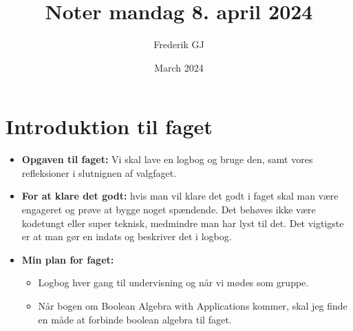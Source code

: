 \documentclass{article}
\title{Noter mandag 8. april 2024}
\author{Frederik GJ}
\date{March 2024}
\begin{document}
\maketitle

\section{Introduktion til faget}

\begin{itemize}
    \item \textbf{Opgaven til faget:} Vi skal lave en logbog og bruge den, samt vores refleksioner i slutnignen af valgfaget. 
    \item \textbf{For at klare det godt:} hvis man vil klare det godt i faget skal man være engageret og prøve at bygge noget spændende. Det behøves ikke være kodetungt eller super teknisk, medmindre man har lyst til det. 
    Det vigtigste er at man gør en indats og beskriver det i logbog. 
    \item \textbf{Min plan for faget:}
    \begin{itemize}
        \item Logbog hver gang til undervisning og når vi mødes som gruppe. 
        \item Når bogen om Boolean Algebra with Applications kommer, skal jeg finde en måde at forbinde boolean algebra til faget. 
    \end{itemize}
\end{itemize}
\end{document}
